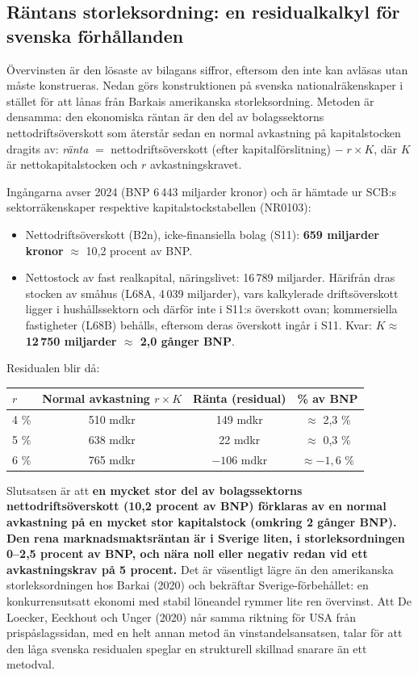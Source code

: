 \documentclass[11pt]{article}
\begin{document}
\subsection*{Räntans storleksordning: en residualkalkyl för svenska förhållanden}

Övervinsten är den lösaste av bilagans siffror, eftersom den inte kan avläsas utan måste konstrueras. Nedan görs konstruktionen på svenska nationalräkenskaper i stället för att lånas från Barkais amerikanska storleksordning. Metoden är densamma: den ekonomiska räntan är den del av bolagssektorns nettodriftsöverskott som återstår sedan en normal avkastning på kapitalstocken dragits av: \emph{ränta} $=$ nettodriftsöverskott (efter kapitalförslitning) $-\; r \times K$, där $K$ är nettokapitalstocken och $r$ avkastningskravet.

Ingångarna avser 2024 (BNP 6\,443 miljarder kronor) och är hämtade ur SCB:s sektorräkenskaper respektive kapitalstockstabellen (NR0103):

\begin{itemize}
\item Nettodriftsöverskott (B2n), icke-finansiella bolag (S11): \textbf{659 miljarder kronor} $\approx$ 10,2 procent av BNP.
\item Nettostock av fast realkapital, näringslivet: 16\,789 miljarder. Härifrån dras stocken av småhus (L68A, 4\,039 miljarder), vars kalkylerade driftsöverskott ligger i hushållssektorn och därför inte i S11:s överskott ovan; kommersiella fastigheter (L68B) behålls, eftersom deras överskott ingår i S11. Kvar: \textbf{$K \approx$ 12\,750 miljarder $\approx$ 2,0 gånger BNP}.
\end{itemize}

Residualen blir då:

\begin{center}
\begin{tabular}{@{}lccc@{}}
\hline
$r$ & Normal avkastning $r\times K$ & Ränta (residual) & \% av BNP \\
\hline
4 \% & 510 mdkr & 149 mdkr & $\approx$ 2,3 \% \\
5 \% & 638 mdkr & 22 mdkr & $\approx$ 0,3 \% \\
6 \% & 765 mdkr & $-106$ mdkr & $\approx -1{,}6$ \% \\
\hline
\end{tabular}
\end{center}

Slutsatsen är att \textbf{en mycket stor del av bolagssektorns nettodriftsöverskott (10,2 procent av BNP) förklaras av en normal avkastning på en mycket stor kapitalstock (omkring 2 gånger BNP). Den rena marknadsmaktsräntan är i Sverige liten, i storleksordningen 0--2,5 procent av BNP, och nära noll eller negativ redan vid ett avkastningskrav på 5 procent.} Det är väsentligt lägre än den amerikanska storleksordningen hos Barkai (2020) och bekräftar Sverige-förbehållet: en konkurrensutsatt ekonomi med stabil löneandel rymmer lite ren övervinst. Att De Loecker, Eeckhout och Unger (2020) når samma riktning för USA från prispåslagssidan, med en helt annan metod än vinstandelsansatsen, talar för att den låga svenska residualen speglar en strukturell skillnad snarare än ett metodval.
\end{document}
